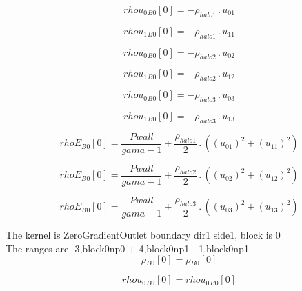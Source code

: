 \documentclass{article}
\begin{document}
\begin{dmath}{rhou_{0}{_{B0}}}[{0}] = - \rho_{halo 1} \,.\, u_{01}\end{dmath}

\begin{dmath}{rhou_{1}{_{B0}}}[{0}] = - \rho_{halo 1} \,.\, u_{11}\end{dmath}

\begin{dmath}{rhou_{0}{_{B0}}}[{0}] = - \rho_{halo 2} \,.\, u_{02}\end{dmath}

\begin{dmath}{rhou_{1}{_{B0}}}[{0}] = - \rho_{halo 2} \,.\, u_{12}\end{dmath}

\begin{dmath}{rhou_{0}{_{B0}}}[{0}] = - \rho_{halo 3} \,.\, u_{03}\end{dmath}

\begin{dmath}{rhou_{1}{_{B0}}}[{0}] = - \rho_{halo 3} \,.\, u_{13}\end{dmath}

\begin{dmath}{rhoE{_{B0}}}[{0}] = \frac{Pwall}{gama - 1} + \frac{\rho_{halo 1}}{2} \,.\, \left(\left(u_{01} \right)^{2} + \left(u_{11} \right)^{2}\right)\end{dmath}

\begin{dmath}{rhoE{_{B0}}}[{0}] = \frac{Pwall}{gama - 1} + \frac{\rho_{halo 2}}{2} \,.\, \left(\left(u_{02} \right)^{2} + \left(u_{12} \right)^{2}\right)\end{dmath}

\begin{dmath}{rhoE{_{B0}}}[{0}] = \frac{Pwall}{gama - 1} + \frac{\rho_{halo 3}}{2} \,.\, \left(\left(u_{03} \right)^{2} + \left(u_{13} \right)^{2}\right)\end{dmath}

\noindent The kernel is ZeroGradientOutlet boundary dir1 side1, block is 0\\\noindent The ranges are -3,block0np0 + 4,block0np1 - 1,block0np1\\\begin{dmath}{\rho{_{B0}}}[{0}] = {\rho{_{B0}}}[{0}]\end{dmath}

\begin{dmath}{rhou_{0}{_{B0}}}[{0}] = {rhou_{0}{_{B0}}}[{0}]\end{dmath}
\end{document}
